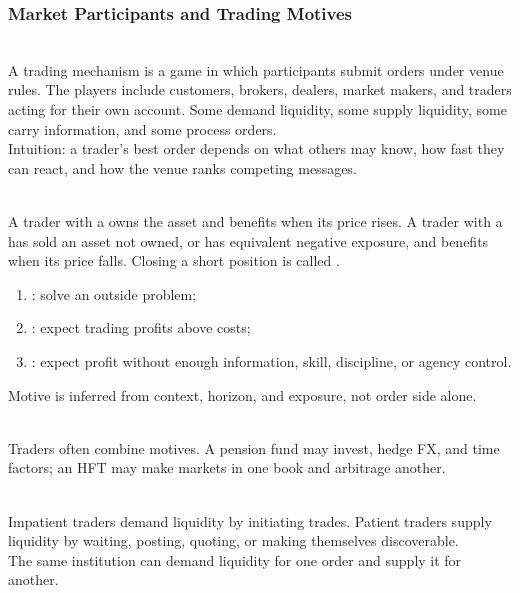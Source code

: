 \subsubsection{Market Participants and Trading Motives}

\begin{model} \\
A trading mechanism is a game in which participants submit orders under venue rules. The players include customers, brokers, dealers, market makers, and traders acting for their own account. Some demand liquidity, some supply liquidity, some carry information, and some process orders.\\
Intuition: a trader's best order depends on what others may know, how fast they can react, and how the venue ranks competing messages.
\end{model}

\begin{notation} \\
A trader with a  owns the asset and benefits when its price rises. A trader with a  has sold an asset not owned, or has equivalent negative exposure, and benefits when its price falls. Closing a short position is called .
\end{notation}

\begin{taxonomy} 
\begin{enumerate}[label=\roman*.]
\setlength{\itemsep}{0pt}
\item {}: solve an outside problem;
\item {}: expect trading profits above costs;
\item {}: expect profit without enough information, skill, discipline, or agency control.
\end{enumerate}
Motive is inferred from context, horizon, and exposure, not order side alone.
\end{taxonomy}

\begin{caveat} \\
Traders often combine motives. A pension fund may invest, hedge FX, and time factors; an HFT may make markets in one book and arbitrage another.
\end{caveat}

\begin{principle} \\
Impatient traders demand liquidity by initiating trades. Patient traders supply liquidity by waiting, posting, quoting, or making themselves discoverable.\\
The same institution can demand liquidity for one order and supply it for another.
\end{principle}


